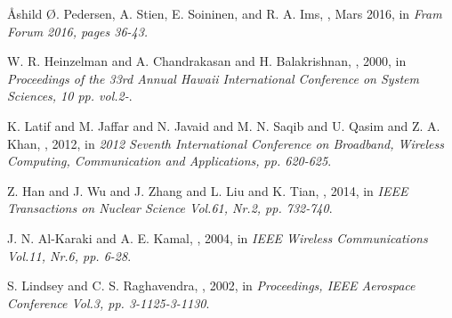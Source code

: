 \documentclass[USenglish]{uit-thesis}
\begin{document}
\begin{thebibliography}{9}

Åshild Ø. Pedersen, A. Stien, E. Soininen, and R. A. Ims,
, Mars 2016,
\newblock in {\em  Fram Forum 2016, pages 36-43.}

W. R. Heinzelman and A. Chandrakasan and H. Balakrishnan,
, 2000,
\newblock in {\em Proceedings of the 33rd Annual Hawaii International Conference on System Sciences, 10 pp. vol.2-}.

K. Latif and M. Jaffar and N. Javaid and M. N. Saqib and U. Qasim and Z. A. Khan,
, 2012,
\newblock in {\em 2012 Seventh International Conference on Broadband, Wireless Computing, Communication and Applications, pp. 620-625}.


Z. Han and J. Wu and J. Zhang and L. Liu and K. Tian,
, 2014,
\newblock in {\em IEEE Transactions on Nuclear Science Vol.61, Nr.2, pp. 732-740}.

J. N. Al-Karaki and A. E. Kamal,
, 2004,
\newblock in {\em IEEE Wireless Communications Vol.11, Nr.6, pp. 6-28}.

S. Lindsey and C. S. Raghavendra,
, 2002,
\newblock in {\em Proceedings, IEEE Aerospace Conference Vol.3, pp. 3-1125-3-1130}.



\end{thebibliography}
\end{document}
